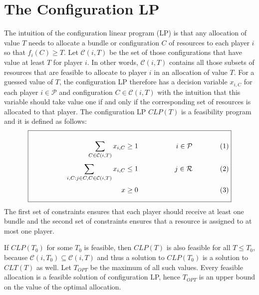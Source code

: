 \documentclass{llncs}
\newcommand{\res}{\ensuremath{\mathcal{R}}\xspace}
\newcommand{\players}{\ensuremath{\mathcal{P}}\xspace}
\newcommand{\conf}[1]{\ensuremath{\mathcal{C}(#1)}}
\begin{document}
\section{The Configuration LP}
\label{sec:CLP}
The intuition of the configuration linear program (LP) is that any
allocation of value $T$ needs to allocate a bundle or configuration
$C$ of resources to each player $i$ so that $f_i(C) \geq T$.  Let
$\conf{i,T}$ be the set of those configurations that have value at
least $T$ for player $i$. In other words, $\conf{i,T}$ contains all
those subsets of resources that are feasible to allocate to player $i$
in an allocation of value $T$. For a guessed value of $T$, the
configuration LP therefore has a decision variable $x_{i, C}$ for each
player $i\in \players$ and configuration $C \in \conf{i,T}$ with the
intuition that this variable should take value one if and only if the
corresponding set of resources is allocated to that player. The configuration LP
$CLP(T)$ is a feasibility program and it is defined as follows:
\begin{equation*}
\boxed{\begin{minipage}{10cm}\begin{align*}
            \sum_{C\in \conf{i,T}} x_{i,C} &\geq 1  &  i \in \players \\[1mm]
            \sum_{i,C: j\in C, C\in \conf{i,T}} x_{i,C} &\leq 1 & j \in \res \\[1mm]
            x & \geq 0
          \end{align*}
          \vspace{-0.4cm}
        \end{minipage}}
\end{equation*}
The first set of constraints ensures that each player should receive
at least one bundle and the second set of constraints ensures that a
resource is assigned to at most one player.

If $CLP(T_0)$ for some $T_0$ is feasible, then $CLP(T)$ is also feasible for all
$T\leq T_0$, because $\conf{i, T_0}\subseteq \conf{i, T}$ and thus a solution to
$CLP(T_0)$ is a solution to $CLT(T)$ as well. Let $T_{OPT}$
be the maximum of all such values. Every
feasible allocation is a feasible solution of configuration LP, hence
$T_{OPT}$ is an upper bound on the value of the optimal allocation.
\end{document}
